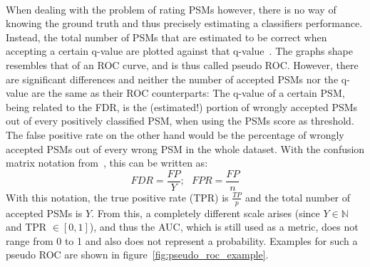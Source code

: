 	\renewcommand{\baselinestretch}{1}
	\\
	When dealing with the problem of rating PSMs however, there is no way of knowing the ground truth and thus precisely estimating a classifiers performance. Instead, the total number of PSMs that are estimated to be correct when accepting a certain q-value are plotted against that q-value~\cite{Kll2007, Granholm2012}. The graphs shape resembles that of an ROC curve, and is thus called pseudo ROC. However, there are significant differences and neither the number of accepted PSMs nor the q-value are the same as their ROC counterparts: The q-value of a certain PSM, being related to the FDR, is the (estimated!) portion of wrongly accepted PSMs out of every positively classified PSM, when using the PSMs score as threshold. The false positive rate on the other hand would be the percentage of wrongly accepted PSMs out of every wrong PSM in the whole dataset. With the confusion matrix notation from~\citet{Fawcett2006}, this can be written as:\\
	\begin{equation}
		FDR = \frac{FP}{Y};~~~ FPR = \frac{FP}{n}
	\end{equation}
	With this notation, the true positive rate (TPR) is $\frac{TP}{p}$ and the total number of accepted PSMs is $Y$. From this, a completely different scale arises (since $Y \in \mathbb{N}$ and TPR $\in [0,1]$), and thus the AUC, which is still used as a metric, does not range from 0 to 1 and also does not represent a probability. Examples for such a pseudo ROC are shown in figure~\ref{fig:pseudo_roc_example}.
	\renewcommand{\baselinestretch}{0.9}
